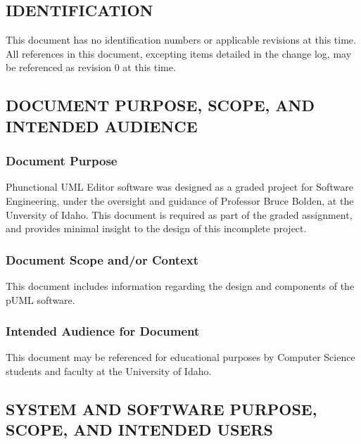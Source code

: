 \documentclass[twoside,letterpaper]{article}
\begin{document}
\subsection{IDENTIFICATION}

{\color{black}
This document has no identification numbers or applicable
revisions at this time.  All references in this document,
excepting items detailed in the change log, may be referenced
as revision 0 at this time.

\subsection[DOCUMENT PURPOSE, SCOPE, AND INTENDED
AUDIENCE]{\bfseries\color{black} DOCUMENT
PURPOSE, SCOPE, AND INTENDED AUDIENCE}

\subsubsection{Document Purpose}
{\color{black}
Phunctional UML Editor software was designed as a graded project for
Software Engineering, under the oversight and guidance of Professor
Bruce Bolden, at the Unversity of Idaho.  This document is required
as part of the graded assignment, and provides minimal insight to the
design of this incomplete project.  
}

\subsubsection{Document Scope and/or Context}
{\color{black}
This document includes information regarding the design and components of the pUML software.
}

\subsubsection{Intended Audience for Document}
{\color{black}
This document may be referenced for educational purposes by
Computer Science students and faculty at the University of Idaho.

}

\subsection[SYSTEM AND SOFTWARE PURPOSE, SCOPE, AND INTENDED
USERS]{\bfseries\color{black} SYSTEM AND
SOFTWARE PURPOSE, SCOPE, AND INTENDED USERS}


}
\end{document}
